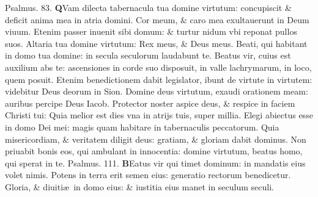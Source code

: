 \documentclass[a5paper,10pt]{book}
\def\ae{æ}
\begin{document}
\begin{multicols*}{2}
\newline \color{red} Psalmus. 83. \color{black}
\vspace{-.5em}
\lettrine[lines=2]{\bfseries \color{red} Q}{}Vam dilecta tabernacula tua domine virtutum: concupiscit \& deficit anima mea in atria domini.
\newline \color{red} C\color{black}or meum, \& caro mea exultauerunt in Deum viuum.
\newline \color{red} E\color{black}tenim passer inuenit sibi domum: \& turtur nidum vbi reponat pullos suos.%
\newline \color{red} A\color{black}ltaria tua domine virtutum: Rex meus, \& Deus meus.
\newline \color{red} B\color{black}eati, qui habitant in domo tua domine: in secula seculorum laudabunt te.
\newline \color{red} B\color{black}eatus vir, cuius est auxilium abs te: ascensiones in corde suo disposuit, in valle lachrymarum, in loco, quem posuit.
\newline \color{red} E\color{black}tenim benedictionem dabit legislator, ibunt de virtute in virtutem: videbitur Deus deorum in Sion.
\newline \color{red} D\color{black}omine deus virtutum, exaudi orationem meam: auribus percipe Deus Iacob.
\newline \color{red} P\color{black}rotector noster aspice deus, \& respice in faciem Christi tui:
\newline \color{red} Q\color{black}uia melior est dies vna in atrijs tuis, super millia.
\newline \color{red} E\color{black}legi abiectus esse in domo Dei mei: magis quam habitare in tabernaculis peccatorum.
\newline \color{red} Q\color{black}uia misericordiam, \& veritatem diligit deus: gratiam, \& gloriam dabit dominus.
\newline \color{red} N\color{black}on priuabit bonis eos, qui ambulant in innocentia: domine virtutum, beatus homo, qui sperat in te.
\newline \color{red} Psalmus. 111. \color{black}
\vspace{-.5em}
\lettrine[lines=2]{\bfseries \color{red} B}{}Eatus vir qui timet dominum: in mandatis eius volet nimis.
\newline \color{red} P\color{black}otens in terra erit semen eius: generatio rectorum benedicetur.
\newline \color{red} G\color{black}loria, \& diuiti\ae \ in domo eius: \& iustitia eius manet in seculum seculi.

\end{multicols*}
\end{document}
